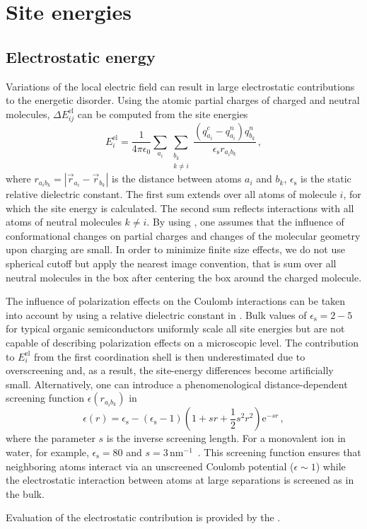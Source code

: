\section{Site energies}
\label{sec:site_energies}

\subsection{Electrostatic energy}
\label{sec:electrostatic}
Variations of the local electric field can result in large electrostatic contributions to the energetic disorder. Using the atomic partial charges of charged and neutral molecules, $\Delta E_{ij}^\text{el}$ can be computed from the site energies~\cite{kirkpatrick_columnar_2008}
\begin{equation}
E_{i}^\text{el}  = \frac{1}{4 \pi \epsilon_0} \sum_{a_i} \sum_{\substack{b_k   \\ k\neq i }}
\frac{ \left( q^c_{a_i} - q^n_{a_i} \right) q^n_{b_k}}{ \epsilon_\text{s} r_{a_i b_k}} 
\, ,
\label{equ:estatic}
\end{equation}
where $r_{a_i b_k}=|\vec{r}_{a_i} - \vec{r}_{b_k}|$ is the distance between atoms $a_i$ and $b_k$,   $\epsilon_\text{s}$ is the static relative dielectric constant.
%
The first sum extends over all atoms of molecule $i$, for which the site energy is calculated. The second sum reflects interactions with all atoms of neutral molecules $k \ne i$. By using , one assumes that the influence of conformational changes on partial charges and changes of the molecular geometry upon charging are small. In order to minimize finite size effects, we do not use spherical cutoff but apply the nearest image convention, that is sum over all neutral molecules in the box after centering the box around the charged molecule. 

The influence of polarization effects on the Coulomb interactions can be taken into account by using a relative dielectric constant in . Bulk values of  $\epsilon_\text{s} = 2-5$ for typical organic semiconductors uniformly scale all site energies but are not capable of describing polarization effects on a microscopic level. 
The contribution to $E_i^\text{el}$ from the first coordination shell is then underestimated due to overscreening and, as a result, the site-energy differences become artificially small. Alternatively, one can introduce a phenomenological distance-dependent screening function $\epsilon(r_{a_i b_k})$ in~~\cite{nagata_atomistic_2008}
\begin{equation}
\epsilon(r)=\epsilon_{\text{s}} - (\epsilon_{\text{s}} - 1)
\left( 1 + sr + \frac{1}{2}s^2r^2 \right) 
\mathrm{e}^{ -sr}\,,
\label{equ:epss}
\end{equation}
where the parameter $s$ is the inverse screening length. For a monovalent ion in water, for example, $\epsilon_{\text{s}}=80$ and $s=3\,\textrm{nm}^{-1}$~\cite{daggett_molecular_1991}. This screening function ensures that neighboring atoms interact via an unscreened Coulomb potential ($\epsilon \sim 1$) while the electrostatic interaction between atoms at large separations is screened as in the bulk. 

Evaluation of the electrostatic contribution is provided by the  \calculator.
